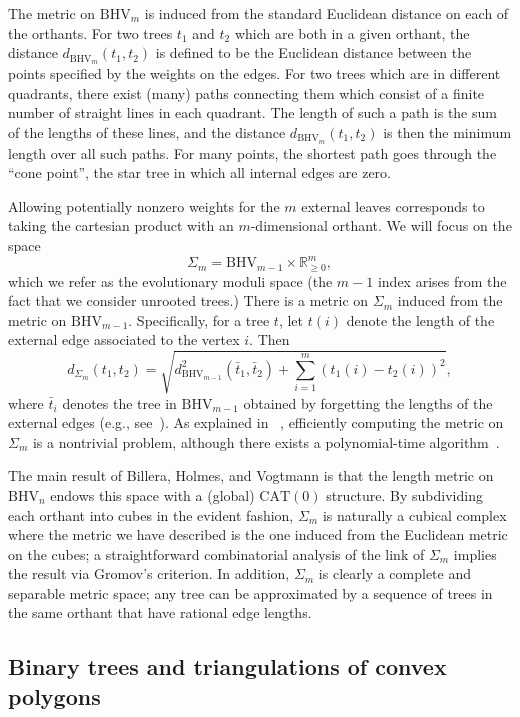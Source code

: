\documentclass[a4paper,11pt]{article}
\newcommand{\CAT}{\textrm{CAT}}
\newcommand{\BHV}{\textrm{BHV}}
\begin{document}
The metric on $\BHV_{m}$ is induced from the standard Euclidean distance on each of the orthants.
For two trees $t_1$ and $t_2$ which are both in a given orthant, the distance $d_{\BHV_{m}}(t_1,t_2)$ is defined to be the Euclidean distance between the points specified by the weights on the edges.
For two trees which are in different quadrants, there exist (many) paths connecting them which consist of a finite number of straight lines in each quadrant.
The length of such a path is the sum of the lengths of these lines, and the distance $d_{\BHV_{m}}(t_1,t_2)$ is then the minimum length over all such
paths.
For many points, the shortest path goes through the ``cone point'', the star tree in which all internal edges are zero.

Allowing potentially nonzero weights for the $m$ external leaves corresponds to taking the cartesian product with an $m$-dimensional orthant.
We will focus on the space \[\Sigma_m = \BHV_{m-1} \times \mathbb{R}^m_{\geq 0},\] which we refer as the evolutionary moduli space (the $m-1$ index
arises from the fact that we consider unrooted trees.)
There is a metric on $\Sigma_m$ induced from the metric on $\BHV_{m-1}$.
Specifically, for a tree $t$, let $t(i)$ denote the length of the external edge associated to the vertex $i$.
Then \[d_{\Sigma_m}(t_1,t_2) =
\sqrt{d^2_{\BHV_{m-1}}(\bar{t}_1,\bar{t}_2) + \sum_{i=1}^m (t_1(i) -
  t_2(i))^2},\] where $\bar{t}_i$ denotes the tree in $\BHV_{m-1}$
obtained by forgetting the lengths of the external edges (e.g.,
see~\cite{owen2011fast}).
As explained in ~\cite[\S4.2]{billera2001geometry}, efficiently computing the metric on $\Sigma_m$ is a nontrivial problem, although there exists a polynomial-time algorithm~\cite{owen2011fast}.

The main result of Billera, Holmes, and Vogtmann is that the length metric on $\BHV_n$ endows this space with a (global) $\CAT(0)$ structure.
By subdividing each orthant into cubes in the evident fashion, $\Sigma_m$ is naturally a cubical complex where the metric we have described is the one induced from the Euclidean metric on the cubes; a straightforward combinatorial analysis of the link of $\Sigma_m$ implies the result via Gromov's criterion.
In addition, $\Sigma_m$ is clearly a complete and separable metric space; any tree can be approximated by a sequence of trees in the same orthant that have rational edge lengths.

\subsection{Binary trees and triangulations of convex polygons}
\end{document}
